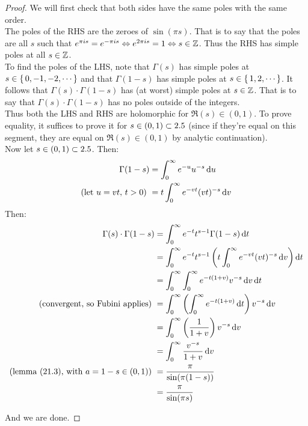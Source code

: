 \begin{proof}
We will first check that both sides have the same poles with the same order.\\

The poles of the RHS are the zeroes of $\sin(\pi s)$. That is to say that the poles are all $s$ such that $e^{\pi i s} = e^{- \pi i s} \Leftrightarrow e^{2 \pi i s} = 1 \Leftrightarrow s \in \mathbb{Z}$. Thus the RHS has simple poles at all $s \in \mathbb{Z}$.\\

To find the poles of the LHS, note that $\Gamma(s)$ has simple poles at $s \in \set{0,-1,-2,\cdots}$ and that $\Gamma(1-s)$ has simple poles at $s \in \set{1,2, \cdots}$. It follows that $\Gamma(s)\cdot \Gamma(1-s)$ has (at worst) simple poles at $s \in \mathbb{Z}$. That is to say that $\Gamma(s)\cdot \Gamma(1-s)$ has no poles outside of the integers.\\

Thus both the LHS and RHS are holomorphic for $\Re(s) \in (0,1)$. To prove equality, it suffices to prove it for $ s \in (0,1) \subset 2.5$ (since if they're equal on this segment, they are equal on $\Re(s) \in (0,1)$ by analytic continuation).\\

Now let $s \in (0,1) \subset 2.5$. Then:
\begin{align*}
    \Gamma(1-s) &= \int_0^\infty e^{-u}u^{-s} \dif u\\
    \text{(let $u = vt, \, t>0$) }&= t \int_0^\infty e^{-vt} (vt)^{-s} \dif v
\end{align*}
Then:
\begin{align*}
    \Gamma(s) \cdot \Gamma(1-s) &= \int_0^\infty e^{-t} t^{s-1} \Gamma(1-s) \dif t\\
    &= \int_0^\infty e^{-t} t^{s-1} \br{t \int_0^\infty e^{-vt} (vt)^{-s} \dif v} \dif t\\
    &= \int_0^\infty \int_0^\infty e^{-t(1+v)} v^{-s} \dif v \dif t\\
    \text{(convergent, so Fubini applies) } &= \int_0^\infty \br{\int_0^\infty e^{-t(1+v)}  \dif t } v^{-s} \dif v\\
    &= \int_0^\infty \br{\frac{1}{1+v}} v^{-s} \dif v\\ 
    &= \int_0^\infty \frac{v^{-s}}{1+v}  \dif v\\
    \text{(lemma (21.3), with $ a = 1-s \in (0,1)$) }&= \frac{\pi}{\sin(\pi (1-s))}\\
    &= \frac{\pi}{\sin(\pi s)}\\
\end{align*}

And we are done.
\end{proof}

